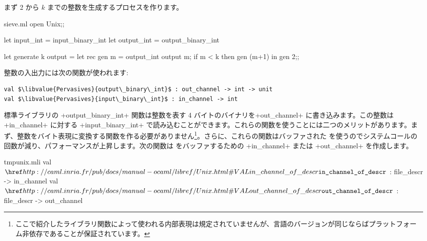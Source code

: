 まず 2 から $k$ までの整数を生成するプロセスを作ります。
%
\begin{listingcodefile}{sieve.ml}
open Unix;;

let input_int = input_binary_int
let output_int = output_binary_int

let generate k output =
  let rec gen m =
    output_int output m;
    if m < k then gen (m+1)
  in
  gen 2;;
\end{listingcodefile}
整数の入出力には次の関数が使われます:
%
\begin{lstlisting}
val $\libvalue{Pervasives}{output\_binary\_int}$ : out_channel -> int -> unit
val $\libvalue{Pervasives}{input\_binary\_int}$ : in_channel -> int
\end{lstlisting}
%
標準ライブラリの \ml+output_binary_int+ 関数は整数を表す 4 バイトのバイナリを\ml+out_channel+ に書き込みます。この整数は \ml+in_channel+ に対する \ml+input_binary_int+ で読み込むことができます。これらの関数を使うことには二つのメリットがあります。まず、整数をバイト表現に変換する関数を作る必要がありません\footnote{ここで紹介したライブラリ関数によって使われる内部表現は規定されていませんが、言語のバージョンが同じならばプラットフォーム非依存であることが保証されています。}。さらに、これらの関数はバッファされた \io を使うのでシステムコールの回数が減り、パフォーマンスが上昇します。次の関数は \io をバッファするための \ml+in_channel+ または \ml+out_channel+ を作成します。
%
\begin{listingcodefile}{tmpunix.mli}
val $\indexlibvalue{Unix}{in\_channel\_of\_descr}$ : file_descr -> in_channel
val $\indexlibvalue{Unix}{out\_channel\_of\_descr}$ : file_descr -> out_channel
\end{listingcodefile}

